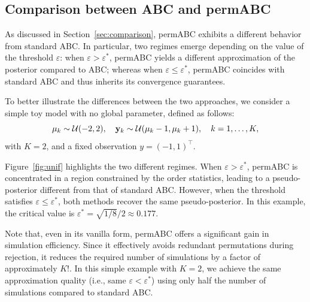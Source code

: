 \subsection{Comparison between ABC and permABC}
\label{sec:abc_vs_permabc}

As discussed in Section~\ref{sec:comparison}, permABC exhibits a different behavior from standard ABC. In particular, two regimes emerge depending on the value of the threshold \( \varepsilon \): when \( \varepsilon > \varepsilon^* \), permABC yields a different approximation of the posterior compared to ABC; whereas when \( \varepsilon \leq \varepsilon^* \), permABC coincides with standard ABC and thus inherits its convergence guarantees.

To better illustrate the differences between the two approaches, we consider a simple toy model with no global parameter, defined as follows:
\[
\mu_k \sim \mathcal{U}(-2, 2), \quad \mathbf{y}_k \sim \mathcal{U}(\mu_k - 1, \mu_k + 1), \quad k = 1, \dots, K,
\]
with \( K = 2 \), and a fixed observation \( y = (-1, 1)^\top \). 

Figure~\ref{fig:unif} highlights the two different regimes. When \( \varepsilon > \varepsilon^* \), permABC is concentrated in a region constrained by the order statistics, leading to a pseudo-posterior different from that of standard ABC. However, when the threshold satisfies \( \varepsilon \leq \varepsilon^* \), both methods recover the same pseudo-posterior. In this example, the critical value is \( \varepsilon^* = \sqrt{1/8}/2 \approx 0.177 \).


Note that, even in its vanilla form, permABC offers a significant gain in simulation efficiency. Since it effectively avoids redundant permutations during rejection, it reduces the required number of simulations by a factor of approximately \( K! \). In this simple example with \( K = 2 \), we achieve the same approximation quality (i.e., same \( \varepsilon < \varepsilon^* \)) using only half the number of simulations compared to standard ABC.


